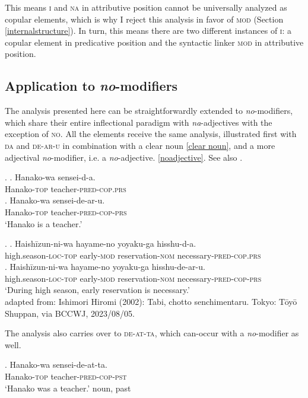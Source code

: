 This means \textsc{i} and \textsc{na} in attributive position cannot be universally analyzed as copular elements, which is why I reject this analysis in favor of \textsc{mod} (Section \ref{internalstructure}). In turn, this means there are two different instances of \textsc{i}: a copular element in predicative position and the syntactic linker \textsc{mod} in attributive position.

\subsection{Application to \textit{no}-modifiers}

The analysis presented here can be straightforwardly extended to \textit{no}-modifiers, which share their entire inflectional paradigm with \textit{na}-adjectives with the exception of \textsc{no}. All the elements receive the same analysis, illustrated first with \textsc{da} and \textsc{de-ar-u} in combination with a clear noun \ref{clear noun}, and a more adjectival \textit{no}-modifier, i.e. a \textit{no}-adjective. \ref{noadjective}. See also \citet[195]{nishiyama:1999:adj}. %

\ex. \label{clear noun} \ag. Hanako-wa sensei-d-a.\\
Hanako-\textsc{top} teacher-\textsc{pred-cop.prs}\\
\bg. Hanako-wa sensei-de-ar-u.\\
Hanako-\textsc{top} teacher-\textsc{pred-cop-prs}\\
`Hanako is a teacher.'

\ex. \label{noadjective} \ag. Haishīzun-ni-wa hayame-no yoyaku-ga hisshu-d-a.\\
high.season-\textsc{loc-top} early-\textsc{mod} reservation-\textsc{nom} necessary-\textsc{pred-cop.prs}\\
\bg. Haishīzun-ni-wa hayame-no yoyaku-ga hisshu-de-ar-u.\\
high.season-\textsc{loc-top} early-\textsc{mod} reservation-\textsc{nom} necessary-\textsc{pred-cop-prs}\\
`During high season, early reservation is necessary.’ \\ adapted from: Ishimori Hiromi (2002): Tabi, chotto senchimentaru. Tokyo: Tōyō Shuppan, via BCCWJ, 2023/08/05.

The analysis also carries over to \textsc{de-at-ta}, which can-occur with a \textit{no}-modifier as well.

\exg. Hanako-wa sensei-de-at-ta.\\
Hanako-\textsc{top} teacher-\textsc{pred-cop-pst}\\
`Hanako was a teacher.' \null \hfill noun, past

